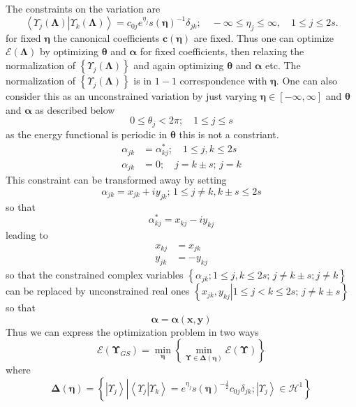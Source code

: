 \documentclass[aps,preprint]{revtex4}%
\begin{document}
The constraints on the variation are
\[
\left\langle \left.  \Upsilon_{j}\left(  \mathbf{\Lambda}\right)  \right\vert
\Upsilon_{k}\left(  \mathbf{\Lambda}\right)  \right\rangle =c_{0j}e^{\eta_{j}%
}\mathit{s}\left(  \mathbf{\eta}\right)  ^{-1}\delta_{jk};\quad-\infty\leq
\eta_{j}\leq\infty,\quad1\leq j\leq2s.
\]
for fixed $\mathbf{\eta}$ the canonical coefficients $\mathbf{c}\left(
\mathbf{\eta}\right)  $ are fixed. Thus one can optimize $\mathcal{E}\left(
\mathbf{\Lambda}\right)  $ by optimizing $\mathbf{\theta}$ and $\mathbf{\alpha
}$ for fixed coefficients, then relaxing the normalization of $\left\{
\Upsilon_{j}\left(  \mathbf{\Lambda}\right)  \right\}  $ and again optimizing
$\mathbf{\theta}$ and $\mathbf{\alpha}$ etc. The normalization of $\left\{
\Upsilon_{j}\left(  \mathbf{\Lambda}\right)  \right\}  $ is in $1-1$
correspondence with $\mathbf{\eta}$. One can also consider this as an
unconstrained variation by just varying $\mathbf{\eta\in}\left[
-\mathbf{\infty,\infty}\right]  $ and $\mathbf{\theta}$ and $\mathbf{\alpha}$
as described below
\[
0\leq\theta_{j}<2\pi;\quad1\leq j\leq s
\]
as the energy functional is periodic in $\mathbf{\theta}$ this is not a
constriant.
\begin{align*}
\alpha_{jk} &  =\alpha_{kj}^{\ast};\quad1\leq j,k\leq2s\\
\alpha_{jk} &  =0;\quad j=k\pm s;\,j=k
\end{align*}
This constraint can be transformed away by setting
\[
\alpha_{jk}=x_{jk}+iy_{jk};\,1\leq j\neq k,k\pm s\leq2s
\]
so that
\begin{equation}
\alpha_{kj}^{\ast}=x_{kj}-iy_{kj}%
\end{equation}
leading to
\begin{align}
x_{kj} &  =x_{jk}\\
y_{jk} &  =-y_{kj}%
\end{align}
so that the constrained complex variables $\left\{  \alpha_{jk};1\leq
j,k\leq2s;\,j\neq k\pm s;j\neq k\right\}  $ can be replaced by unconstrained
real ones $\left\{  \left.  x_{jk},y_{kj}\right\vert 1\leq j<k\leq2s;\,j\neq
k\pm s\right\}  $ so that
\[
\mathbf{\alpha=\alpha}\left(  \mathbf{x},\mathbf{y}\right)
\]
Thus we can express the optimization problem in two ways
\[
\mathcal{E}\left(  \mathbf{\Upsilon}_{GS}\right)  =\min_{\mathbf{\eta}%
}\left\{  \min_{\mathbf{\Upsilon\in\Delta}\left(  \mathbf{\eta}\right)
}\mathcal{E}\left(  \mathbf{\Upsilon}\right)  \right\}
\]
where
\[
\mathbf{\Delta}\left(  \mathbf{\eta}\right)  =\left\{  \left\vert \Upsilon
_{j}\right\rangle \left\vert \overset{}{\left\langle \left.  \Upsilon
_{j}\right\vert \Upsilon_{k}\right\rangle =e^{\eta_{j}}\mathit{s}\left(
\mathbf{\eta}\right)  ^{-\frac{1}{2}}c_{0j}\delta_{jk};\left\vert \Upsilon
_{j}\right\rangle \in\mathcal{H}^{1}}\right.  \right\}
\]%
\end{document}
